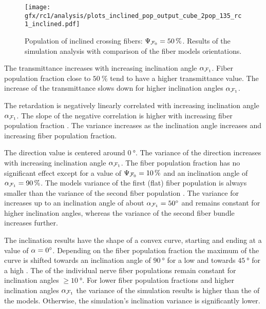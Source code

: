     \begin{figure}[!p]
    \centering
    \texttt{[image: gfx/rc1/analysis/plots\_inclined\_pop\_output\_cube\_2pop\_135\_rc1\_inclined.pdf]}
    \caption[]{Population of inclined crossing fibers: $\textnormal{$\Psi_{\textnormal{$\mathcal{F}_0$}}$}=\SI{50}{\percent}$. Results of the simulation analysis with comparison of the fiber models orientations.}
    \label{fig:inclined_05_fiber_pop_rofl}
\end{figure}
%
The transmittance increases with increasing inclination angle $\textnormal{$\alpha$}_{\textnormal{$\mathcal{F}_1$}}$.
Fiber population fraction close to $\SI{50}{\percent}$ tend to have a higher transmittance value.
The increase of the transmittance slows down for higher inclination angles  $\textnormal{$\alpha$}_{\textnormal{$\mathcal{F}_1$}}$.
\par
The retardation is negatively linearly correlated with increasing inclination angle $\textnormal{$\alpha$}_{\textnormal{$\mathcal{F}_1$}}$.
The slope of the negative correlation is higher with increasing fiber population fraction \modelPsi{}.
The variance increases as the inclination angle increases and increasing fiber population fraction.
\par
The direction value is centered around $\SI{0}{\degree}$.
The variance of the direction increases with increasing inclination angle $\textnormal{$\alpha$}_{\textnormal{$\mathcal{F}_1$}}$.
The fiber population fraction has no significant effect except for a value of $\textnormal{$\Psi_{\textnormal{$\mathcal{F}_0$}}$} = \SI{10}{\percent}$ and an inclination angle of $\textnormal{$\alpha$}_{\textnormal{$\mathcal{F}_1$}}=\SI{90}{\percent}$.
The models \bvariance{} variance of the first (flat) fiber population \popa{} is always smaller than the \bvariance{} variance of the second fiber population \popb{}.
The \bvariance{} variance for \popa{} increases up to an inclination angle of about $\textnormal{$\alpha$}_{\textnormal{$\mathcal{F}_1$}} = \SI{50}{\degree}$ and remains constant for higher inclination angles, whereas the \bvariance{} variance of the second fiber bundle increases further.
\par
The inclination results have the shape of a convex curve, starting and ending at a value of $\textnormal{$\alpha$} = \SI{0}{\degree}$.
Depending on the fiber population fraction \modelPsi{} the maximum of the curve is shifted towards an inclination angle of $\SI{90}{\degree}$ for a low \modelPsi{} and towards $\SI{45}{\degree}$ for a high \modelPsi{}.
The \bvariance{} of the individual nerve fiber populations remain constant for inclination angles $\geq \SI{10}{\degree}$.
For lower fiber population fractions \modelPsi{} and higher inclination angles $\textnormal{$\alpha$}_{\textnormal{$\mathcal{F}_1$}}$ the variance of the simulation results is higher than the \bvariance{} of the models.
Otherwise, the simulation's inclination variance is significantly lower.
